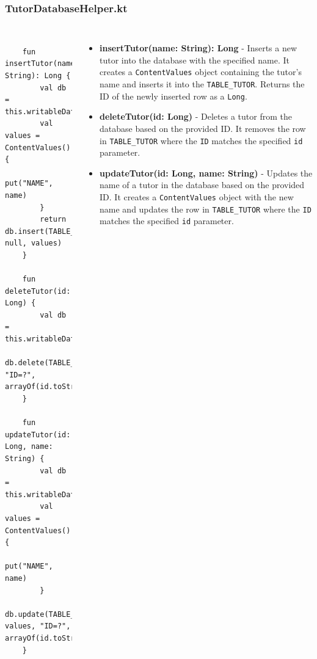 \documentclass[pdf,
serif,
compress,
xcolor=table,
dvipsnames,
spanish,
aspectratio=169]{beamer}
\begin{document}
\begin{frame}[fragile]
    \frametitle{TutorDatabaseHelper.kt}
\begin{columns}
\begin{verbatim}

    fun insertTutor(name: String): Long {
        val db = this.writableDatabase
        val values = ContentValues().apply {
            put("NAME", name)
        }
        return db.insert(TABLE_TUTOR, null, values)
    }

    fun deleteTutor(id: Long) {
        val db = this.writableDatabase
        db.delete(TABLE_TUTOR, "ID=?", arrayOf(id.toString()))
    }

    fun updateTutor(id: Long, name: String) {
        val db = this.writableDatabase
        val values = ContentValues().apply {
            put("NAME", name)
        }
        db.update(TABLE_TUTOR, values, "ID=?", arrayOf(id.toString()))
    }

\end{verbatim}
\begin{itemize}\tiny
    \item \textbf{insertTutor(name: String): Long} - Inserts a new tutor into the database with the specified name. It creates a \texttt{ContentValues} object containing the tutor's name and inserts it into the \texttt{TABLE\_TUTOR}. Returns the ID of the newly inserted row as a \texttt{Long}.
    
    \item \textbf{deleteTutor(id: Long)} - Deletes a tutor from the database based on the provided ID. It removes the row in \texttt{TABLE\_TUTOR} where the \texttt{ID} matches the specified \texttt{id} parameter.
    
    \item \textbf{updateTutor(id: Long, name: String)} - Updates the name of a tutor in the database based on the provided ID. It creates a \texttt{ContentValues} object with the new name and updates the row in \texttt{TABLE\_TUTOR} where the \texttt{ID} matches the specified \texttt{id} parameter.
\end{itemize}
\end{columns}
\end{frame}

\end{document}
